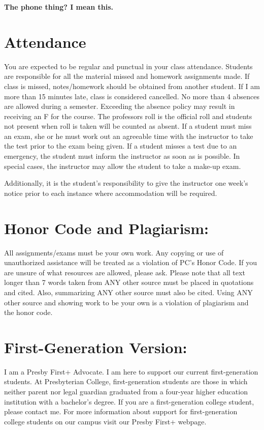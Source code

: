 \documentclass[
]{book}
\begin{document}
\textbf{The phone thing? I mean this.}

\hypertarget{attendance}{%
\section{Attendance}\label{attendance}}

You are expected to be regular and punctual in your class attendance. Students are responsible for all the material missed and homework assignments made. If class is missed, notes/homework should be obtained from another student. If I am more than 15 minutes late, class is considered cancelled. No more than 4 absences are allowed during a semester. Exceeding the absence policy may result in receiving an F for the course. The professors roll is the official roll and students not present when roll is taken will be counted as absent. If a student must miss an exam, she or he must work out an agreeable time with the instructor to take the test prior to the exam being given. If a student misses a test due to an emergency, the student must inform the instructor as soon as is possible. In special cases, the instructor may allow the student to take a make-up exam.

Additionally, it is the student's responsibility to give the instructor one week's notice prior to each instance where accommodation will be required.

\hypertarget{honor-code-and-plagiarism}{%
\section{Honor Code and Plagiarism:}\label{honor-code-and-plagiarism}}

All assignments/exams must be your own work. Any copying or use of unauthorized assistance will be treated as a violation of PC's Honor Code. If you are unsure of what resources are allowed, please ask. Please note that all text longer than 7 words taken from ANY other source must be placed in quotations and cited. Also, summarizing ANY other source must also be cited. Using ANY other source and showing work to be your own is a violation of plagiarism and the honor code.

\hypertarget{first-generation-version}{%
\section{First-Generation Version:}\label{first-generation-version}}

I am a Presby First+ Advocate. I am here to support our current first-generation students. At Presbyterian College, first-generation students are those in which neither parent nor legal guardian graduated from a four-year higher education institution with a bachelor's degree. If you are a first-generation college student, please contact me. For more information about support for first-generation college students on our campus visit our Presby First+ webpage.
\end{document}
